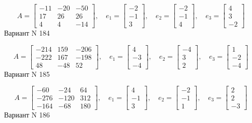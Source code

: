 \documentclass[11pt]{report}
\begin{document}
$$A = \left[\begin{matrix}-11 & -20 & -50\\17 & 26 & 26\\4 & 4 & -14\end{matrix}\right],\quad e_1 = \left[\begin{matrix}-2\\-1\\3\end{matrix}\right],\quad e_2 = \left[\begin{matrix}-2\\-1\\4\end{matrix}\right],\quad e_3 = \left[\begin{matrix}4\\3\\-2\end{matrix}\right]$$Вариант N 184

$$A = \left[\begin{matrix}-214 & 159 & -206\\-222 & 167 & -198\\48 & -48 & 52\end{matrix}\right],\quad e_1 = \left[\begin{matrix}4\\-3\\-4\end{matrix}\right],\quad e_2 = \left[\begin{matrix}-4\\3\\2\end{matrix}\right],\quad e_3 = \left[\begin{matrix}1\\-2\\-4\end{matrix}\right]$$Вариант N 185

$$A = \left[\begin{matrix}-60 & -24 & 64\\-276 & -120 & 312\\-164 & -68 & 180\end{matrix}\right],\quad e_1 = \left[\begin{matrix}4\\-1\\3\end{matrix}\right],\quad e_2 = \left[\begin{matrix}-2\\-1\\1\end{matrix}\right],\quad e_3 = \left[\begin{matrix}2\\2\\-3\end{matrix}\right]$$Вариант N 186
\end{document}
